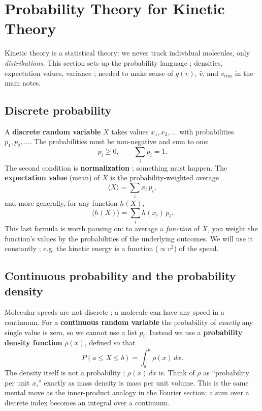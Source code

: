 \documentclass{report}
\numberwithin{equation}{section}
\begin{document}
\section{Probability Theory for Kinetic Theory}
Kinetic theory is a statistical theory: we never track individual molecules, only \emph{distributions}. This section sets up the probability language ; densities, expectation values, variance ; needed to make sense of $g(v)$, $\bar v$, and $v_\text{rms}$ in the main notes.

\subsection{Discrete probability}
A \textbf{discrete random variable} $X$ takes values $x_1,x_2,\ldots$ with probabilities $p_1,p_2,\ldots$. The probabilities must be non-negative and sum to one:
\begin{equation}
	p_i \ge 0,\qquad \sum_i p_i = 1.
\end{equation}
The second condition is \textbf{normalization} ; something must happen. The \textbf{expectation value} (mean) of $X$ is the probability-weighted average
\begin{equation}
	\langle X\rangle = \sum_i x_i\,p_i,
\end{equation}
and more generally, for any function $h(X)$,
\begin{equation}
	\langle h(X)\rangle = \sum_i h(x_i)\,p_i.
\end{equation}
This last formula is worth pausing on: to average a \emph{function} of $X$, you weight the function's values by the probabilities of the underlying outcomes. We will use it constantly ; e.g. the kinetic energy is a function ($\propto v^2$) of the speed.

\subsection{Continuous probability and the probability density}
Molecular speeds are not discrete ; a molecule can have any speed in a continuum. For a \textbf{continuous random variable} the probability of \emph{exactly} any single value is zero, so we cannot use a list $p_i$. Instead we use a \textbf{probability density function} $\rho(x)$, defined so that
\begin{equation}
	P(a \le X \le b) = \int_a^b \rho(x)\,dx.
\end{equation}
The density itself is not a probability ; $\rho(x)\,dx$ is. Think of $\rho$ as ``probability per unit $x$,'' exactly as mass density is mass per unit volume. This is the same mental move as the inner-product analogy in the Fourier section: a sum over a discrete index becomes an integral over a continuum.
\end{document}
